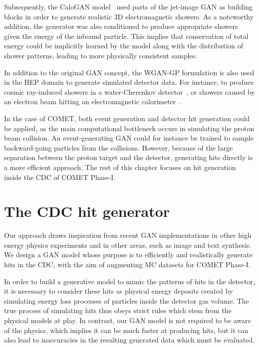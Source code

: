 Subsequently, the {\sc CaloGAN} model~\cite{paganini_calogan_2018} used parts of
the jet-image GAN as building blocks in order to generate realistic 3D
electromagnetic showers. As a noteworthy addition, the generator was also
conditioned to produce appropriate showers given the energy of the inbound
particle. This implies that conservation of total energy could be implicitly
learned by the model along with the distribution of shower patterns, leading to
more physically consistent samples.


In addition to the original GAN concept, the WGAN-GP formulation is also used in
the HEP domain to generate simulated detector data. For instance, to produce
cosmic ray-induced showers in a water-Cherenkov detector~\cite{Erdmann2018}, or
showers caused by an electron beam hitting an electromagnetic
calorimeter~\cite{Erdmann2019}.

In the case of COMET, both event generation and detector hit generation could be
applied, as the main computational bottleneck occurs in simulating the proton
beam collision. An event-generating GAN could for instance be trained to sample
backward-going particles from the collisions. However, because of the large
separation between the proton target and the detector, generating hits directly
is a more efficient approach. The rest of this chapter focuses on hit
generation inside the CDC of COMET Phase\nobreakdash-I.





\section{The CDC hit generator}
Our approach draws inspiration from recent GAN implementations in other high
energy physics experiments and in other areas, such as image and text
synthesis. We design a GAN model whose purpose is to efficiently and
realistically generate hits in the CDC, with the aim of augmenting MC datasets
for COMET Phase\nobreakdash-I.

In order to build a generative model to mimic the patterns of hits in the
detector, it is necessary to consider these hits as physical energy
deposits created by simulating energy loss processes of particles inside the
detector gas volume. The true process of simulating hits thus obeys strict rules
which stem from the physical models at play. In contrast, our GAN model is not
required to be aware of the physics, which implies it can be much faster at
producing hits, but it can also lead to inaccuracies in the resulting generated
data which must be evaluated.

